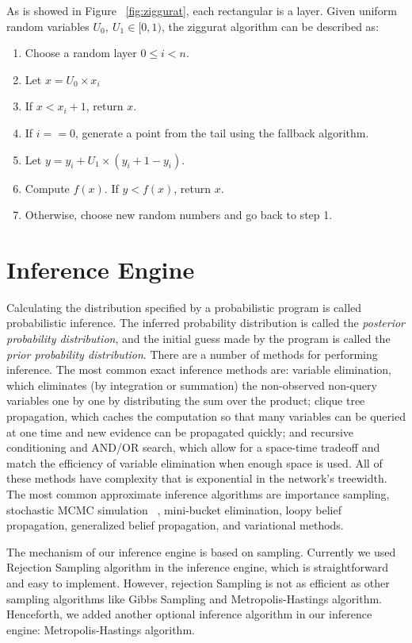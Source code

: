 As is showed in Figure ~\ref{fig:ziggurat}, each rectangular is a layer. Given uniform random variables $U_0,~U_1 \in [0,1)$, the ziggurat algorithm can be described as:
\begin{enumerate}
  \item Choose a random layer $0 \leq i < n$.
  \item Let $x = U_0 \times x_i$
  \item If $x < x_i + 1$, return $x$.
  \item If $i == 0$, generate a point from the tail using the fallback algorithm.
  \item Let $y = y_i + U_1 \times (y_i + 1 − y_i)$.
  \item Compute $f(x)$. If $y < f(x)$, return $x$.
  \item Otherwise, choose new random numbers and go back to step 1.
\end{enumerate}

\section{Inference Engine}
\label{sec:infer}
Calculating the distribution specified by a probabilistic program is called probabilistic inference. The inferred probability distribution is called the \textit{posterior probability distribution}, and the initial guess made by the program is called the \textit{prior probability distribution}. There are a number of methods for performing inference. The most common exact inference methods are: variable elimination, which eliminates (by integration or summation) the non-observed non-query variables one by one by distributing the sum over the product; clique tree propagation, which caches the computation so that many variables can be queried at one time and new evidence can be propagated quickly; and recursive conditioning and AND/OR search, which allow for a space-time tradeoff and match the efficiency of variable elimination when enough space is used. All of these methods have complexity that is exponential in the network's treewidth. The most common approximate inference algorithms are importance sampling, stochastic MCMC simulation ~\cite{mcmc}, mini-bucket elimination, loopy belief propagation, generalized belief propagation, and variational methods.

The mechanism of our inference engine is based on sampling. Currently we used Rejection Sampling algorithm in the inference engine, which is straightforward and easy to implement. However, rejection Sampling is not as efficient as other sampling algorithms like Gibbs Sampling and Metropolis-Hastings algorithm. Henceforth, we added another optional inference algorithm in our inference engine: Metropolis-Hastings algorithm. 


